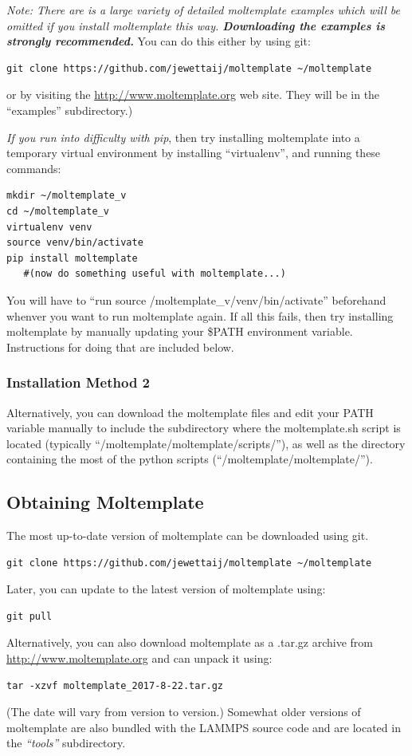 \documentclass[11pt]{article}
\newcommand{\textapprox}{\raisebox{0.5ex}{\texttildelow}}
\begin{document}
\textit{Note: There are is a large variety of detailed moltemplate examples
which will be omitted if you install moltemplate this way.
\textbf{Downloading the examples is strongly recommended.}}
You can do this either by using git:
\begin{verbatim}
git clone https://github.com/jewettaij/moltemplate ~/moltemplate
\end{verbatim}
or by visiting the \url{http://www.moltemplate.org} web site.
They will be in the ``examples'' subdirectory.)

\textit{If you run into difficulty with pip}, then try installing
moltemplate into a temporary virtual environment
by installing ``virtualenv'',
and running these commands:
\begin{verbatim}
mkdir ~/moltemplate_v
cd ~/moltemplate_v
virtualenv venv
source venv/bin/activate
pip install moltemplate
   #(now do something useful with moltemplate...)
\end{verbatim}
You will have to ``run source \textapprox/moltemplate\_v/venv/bin/activate'' beforehand whenver you want to run moltemplate again.  If all this fails, then try installing moltemplate by manually updating your \$PATH environment variable.  Instructions for doing that are included below.


\subsubsection*{Installation Method 2}

Alternatively, you can download the moltemplate files and edit your
PATH variable manually to include
the subdirectory where the moltemplate.sh script is located 
(typically ``\textapprox/moltemplate/moltemplate/scripts/''), as well as
the directory containing the most of the python scripts
(``\textapprox/moltemplate/moltemplate/'').

\subsection*{Obtaining Moltemplate}
The most up-to-date version of moltemplate can be downloaded using git.
\begin{verbatim}
git clone https://github.com/jewettaij/moltemplate ~/moltemplate
\end{verbatim}
Later, you can update to the latest version of moltemplate using:
\begin{verbatim}
git pull
\end{verbatim}
Alternatively, you can also download moltemplate as a .tar.gz archive from
\url{http://www.moltemplate.org}
and can unpack it using:
\begin{verbatim}
tar -xzvf moltemplate_2017-8-22.tar.gz
\end{verbatim}
(The date will vary from version to version.)
Somewhat older versions of moltemplate are also bundled with the LAMMPS 
source code and are located in the \textit{``tools''} subdirectory.
\end{document}
